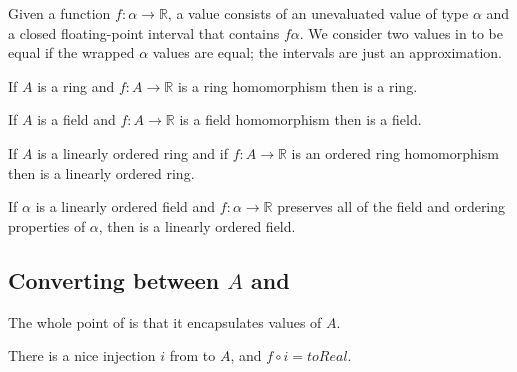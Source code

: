 \begin{definition}
  \label{def:filtered}
  \leanok
  Given a function $f : α → ℝ$, a  value consists of
  an unevaluated value of type $α$ and a closed floating-point interval that
  contains $f α$. We consider two values in  to be
  equal if the wrapped $α$ values are equal; the intervals are just an
  approximation.
\end{definition}

\begin{lemma}
  \label{thm:filteredRing}
  If $A$ is a ring and $f : A → ℝ$ is a ring homomorphism then 
  is a ring.
\end{lemma}

\begin{lemma}
  \label{thm:filteredField}
  If $A$ is a field and $f : A → ℝ$ is a field homomorphism then 
  is a field.
\end{lemma}

\begin{lemma}
  \label{thm:filteredOrderedRing}
  If $A$ is a linearly ordered ring and if $f : A → ℝ$ is an ordered ring homomorphism then
   is a linearly ordered ring.
\end{lemma}

\begin{theorem}
  \label{thm:filteredOrderedField}
  If $α$ is a linearly ordered field and $f : α → ℝ$ preserves all of the field
  and ordering properties of $α$, then  is a linearly
  ordered field.
\end{theorem}

\subsection{Converting between $A$ and }

The whole point of  is that it encapsulates values of
$A$.

\begin{definition}
  \label{def:filteredEquivalent}
  \notready
  There is a nice injection $i$ from  to
  $A$, and $f \circ i = toReal$.
\end{definition}

